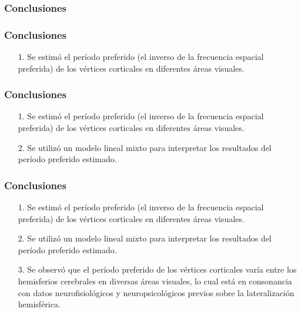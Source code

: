 \documentclass[
11pt, %
%
aspectratio=169, %
]{beamer}
\begin{document}
	\begin{frame}
		\frametitle{Conclusiones}
		
	
		
	\end{frame}

		\begin{frame}
		\frametitle{Conclusiones}
		
		\begin{minipage}[t][0.8\textheight][t]{\textwidth}
			\begin{itemize}
				\item[1.] Se estim\'o el período preferido (el inverso de la frecuencia espacial preferida) de los vértices corticales en diferentes áreas visuales.
				
			\end{itemize}
		\end{minipage}
		
		
		
	\end{frame}

		\begin{frame}
		\frametitle{Conclusiones}
			\begin{minipage}[t][0.8\textheight][t]{\textwidth}
			\begin{itemize}
				\item[1.] Se estim\'o el período preferido (el inverso de la frecuencia espacial preferida) de los vértices corticales en diferentes áreas visuales.
				\item  [2.] Se utiliz\'o un modelo lineal mixto para interpretar los resultados del período preferido estimado.
			\end{itemize}
		\end{minipage}
		
		
	\end{frame}

		\begin{frame}
		\frametitle{Conclusiones}
			\begin{minipage}[t][0.8\textheight][t]{\textwidth}
			\begin{itemize}
				 \item[1.] Se estim\'o el período preferido (el inverso de la frecuencia espacial preferida) de los vértices corticales en diferentes áreas visuales.
				\item  [2.] Se utiliz\'o un modelo lineal mixto para interpretar los resultados del período preferido estimado.
				\item [3.] Se observ\'o que el período preferido de los v\'ertices corticales varía entre los hemisferios cerebrales en diversas áreas visuales, lo cual est\'a en consonancia con datos neurofisiológicos y neuropsicológicos previos  sobre la lateralización hemisférica.
			\end{itemize}
		\end{minipage}
	
		
	\end{frame}
\end{document}
